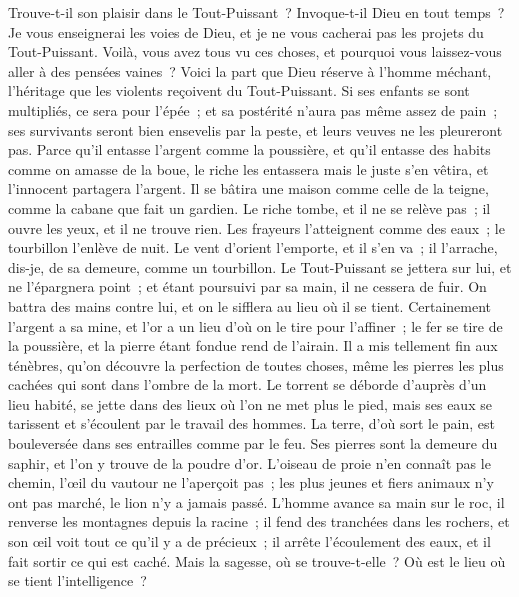 \begin{multicols}{2}
Trouve-t-il son plaisir dans le Tout-Puissant~? Invoque-t-il Dieu en tout temps~?
Je vous enseignerai les voies de Dieu, et je ne vous cacherai pas les projets du Tout-Puissant.
Voilà, vous avez tous vu ces choses, et pourquoi vous laissez-vous aller à des pensées vaines~?
Voici la part que Dieu réserve à l'homme méchant, l'héritage que les violents reçoivent du Tout-Puissant.
Si ses enfants se sont multipliés, ce sera pour l'épée~; et sa postérité n'aura pas même assez de pain~;
ses survivants seront bien ensevelis par la peste, et leurs veuves ne les pleureront pas.
Parce qu'il entasse l'argent comme la poussière, et qu'il entasse des habits comme on amasse de la boue,
le riche les entassera mais le juste s'en vêtira, et l'innocent partagera l'argent.
Il se bâtira une maison comme celle de la teigne, comme la cabane que fait un gardien.
Le riche tombe, et il ne se relève pas~; il ouvre les yeux, et il ne trouve rien.
Les frayeurs l'atteignent comme des eaux~; le tourbillon l'enlève de nuit.
Le vent d'orient l'emporte, et il s'en va~; il l'arrache, dis-je, de sa demeure, comme un tourbillon.
 Le Tout-Puissant se jettera sur lui, et ne l'épargnera point~; et étant poursuivi par sa main, il ne cessera de fuir.
On battra des mains contre lui, et on le sifflera au lieu où il se tient.
\VerseOne{}Certainement l'argent a sa mine, et l'or a un lieu d'où on le tire pour l'affiner~;
le fer se tire de la poussière, et la pierre étant fondue rend de l'airain.
Il a mis tellement fin aux ténèbres, qu'on découvre la perfection de toutes choses, même les pierres les plus cachées qui sont dans l'ombre de la mort.
Le torrent se déborde d'auprès d'un lieu habité, se jette dans des lieux où l'on ne met plus le pied, mais ses eaux se tarissent et s'écoulent par le travail des hommes.
La terre, d'où sort le pain, est bouleversée dans ses entrailles comme par le feu.
Ses pierres sont la demeure du saphir, et l'on y trouve de la poudre d'or.
L'oiseau de proie n'en connaît pas le chemin, l'œil du vautour ne l'aperçoit pas~;
les plus jeunes et fiers animaux n'y ont pas marché, le lion n'y a jamais passé.
L'homme avance sa main sur le roc, il renverse les montagnes depuis la racine~;
il fend des tranchées dans les rochers, et son œil voit tout ce qu'il y a de précieux~;
il arrête l'écoulement des eaux, et il fait sortir ce qui est caché.
Mais la sagesse, où se trouve-t-elle~? Où est le lieu où se tient l'intelligence~?

\end{multicols}

